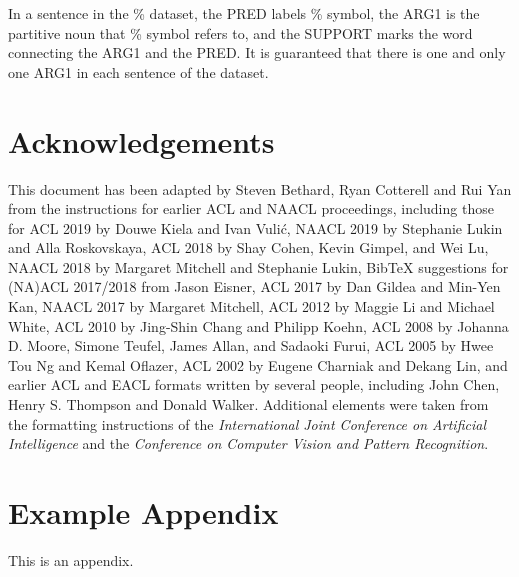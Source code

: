 \documentclass[11pt]{article}
\begin{document}
In a sentence in the \% dataset, the PRED labels \% symbol, the ARG1 is the partitive noun that \% symbol refers to, and the SUPPORT marks the word connecting the ARG1 and the PRED. It is guaranteed that there is one and only one ARG1 in each sentence of the dataset.

\section*{Acknowledgements}

This document has been adapted
by Steven Bethard, Ryan Cotterell and Rui Yan
from the instructions for earlier ACL and NAACL proceedings, including those for
ACL 2019 by Douwe Kiela and Ivan Vuli\'{c},
NAACL 2019 by Stephanie Lukin and Alla Roskovskaya,
ACL 2018 by Shay Cohen, Kevin Gimpel, and Wei Lu,
NAACL 2018 by Margaret Mitchell and Stephanie Lukin,
Bib\TeX{} suggestions for (NA)ACL 2017/2018 from Jason Eisner,
ACL 2017 by Dan Gildea and Min-Yen Kan,
NAACL 2017 by Margaret Mitchell,
ACL 2012 by Maggie Li and Michael White,
ACL 2010 by Jing-Shin Chang and Philipp Koehn,
ACL 2008 by Johanna D. Moore, Simone Teufel, James Allan, and Sadaoki Furui,
ACL 2005 by Hwee Tou Ng and Kemal Oflazer,
ACL 2002 by Eugene Charniak and Dekang Lin,
and earlier ACL and EACL formats written by several people, including
John Chen, Henry S. Thompson and Donald Walker.
Additional elements were taken from the formatting instructions of the \emph{International Joint Conference on Artificial Intelligence} and the \emph{Conference on Computer Vision and Pattern Recognition}.




\appendix

\section{Example Appendix}
\label{sec:appendix}

This is an appendix.
\end{document}
